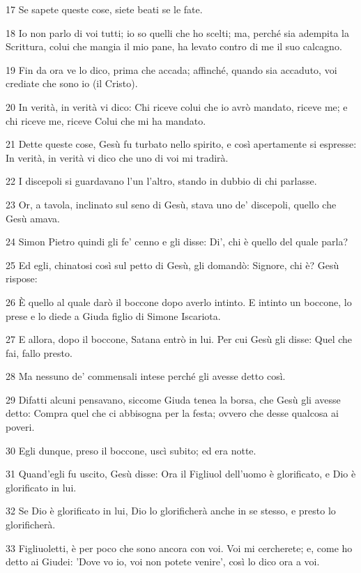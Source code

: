 \par 17 Se sapete queste cose, siete beati se le fate.
\par 18 Io non parlo di voi tutti; io so quelli che ho scelti; ma, perché sia adempita la Scrittura, colui che mangia il mio pane, ha levato contro di me il suo calcagno.
\par 19 Fin da ora ve lo dico, prima che accada; affinché, quando sia accaduto, voi crediate che sono io (il Cristo).
\par 20 In verità, in verità vi dico: Chi riceve colui che io avrò mandato, riceve me; e chi riceve me, riceve Colui che mi ha mandato.
\par 21 Dette queste cose, Gesù fu turbato nello spirito, e così apertamente si espresse: In verità, in verità vi dico che uno di voi mi tradirà.
\par 22 I discepoli si guardavano l'un l'altro, stando in dubbio di chi parlasse.
\par 23 Or, a tavola, inclinato sul seno di Gesù, stava uno de' discepoli, quello che Gesù amava.
\par 24 Simon Pietro quindi gli fe' cenno e gli disse: Di', chi è quello del quale parla?
\par 25 Ed egli, chinatosi così sul petto di Gesù, gli domandò: Signore, chi è? Gesù rispose:
\par 26 È quello al quale darò il boccone dopo averlo intinto. E intinto un boccone, lo prese e lo diede a Giuda figlio di Simone Iscariota.
\par 27 E allora, dopo il boccone, Satana entrò in lui. Per cui Gesù gli disse: Quel che fai, fallo presto.
\par 28 Ma nessuno de' commensali intese perché gli avesse detto così.
\par 29 Difatti alcuni pensavano, siccome Giuda tenea la borsa, che Gesù gli avesse detto: Compra quel che ci abbisogna per la festa; ovvero che desse qualcosa ai poveri.
\par 30 Egli dunque, preso il boccone, uscì subito; ed era notte.
\par 31 Quand'egli fu uscito, Gesù disse: Ora il Figliuol dell'uomo è glorificato, e Dio è glorificato in lui.
\par 32 Se Dio è glorificato in lui, Dio lo glorificherà anche in se stesso, e presto lo glorificherà.
\par 33 Figliuoletti, è per poco che sono ancora con voi. Voi mi cercherete; e, come ho detto ai Giudei: 'Dove vo io, voi non potete venire', così lo dico ora a voi.
